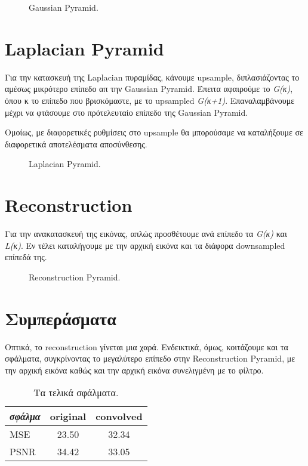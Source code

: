\documentclass[11pt]{scrartcl} %
\begin{document}
\begin{figure}[h]
    \centering
    \caption{Gaussian Pyramid.}
\end{figure}

\section{Laplacian Pyramid}

Για την κατασκευή της Laplacian πυραμίδας, κάνουμε upsample, διπλασιάζοντας το αμέσως μικρότερο επίπεδο απ την Gaussian Pyramid. Έπειτα αφαιρούμε
το \textit{G(κ)}, όπου κ το επίπεδο που βρισκόμαστε, με το upsampled \textit{G(κ+1)}. Επαναλαμβάνουμε μέχρι να φτάσουμε στο πρότελευταίο επίπεδο
της Gaussian Pyramid.


Ομοίως, με διαφορετικές ρυθμίσεις στο upsample θα μπορούσαμε να καταλήξουμε σε διαφορετικά αποτελέσματα αποσύνθεσης.

\begin{figure}[h]
    \centering
    \caption{Laplacian Pyramid.}
\end{figure}
\clearpage

\section{Reconstruction}

Για την ανακατασκευή της εικόνας, απλώς προσθέτουμε ανά επίπεδο τα \textit{G(κ)} και \textit{L(κ)}. Εν τέλει καταλήγουμε με την αρχική εικόνα
και τα διάφορα downsampled επίπεδά της.

\begin{figure}[h]
    \centering
    \caption{Reconstruction Pyramid.}
\end{figure}


\section{Συμπεράσματα}

Οπτικά, το reconstruction γίνεται μια χαρά. Ενδεικτικά, όμως, κοιτάζουμε και τα σφάλματα, συγκρίνοντας το μεγαλύτερο επίπεδο στην Reconstruction Pyramid, με την αρχική εικόνα
καθώς και την αρχική εικόνα συνελιγμένη με το φίλτρο.

\begin{table}[h] %
	\centering %
	\begin{tabular}{l c c}
		\toprule
		\textit{σφάλμα} & \textbf{original} & \textbf{convolved} \\
		\midrule
		\midrule
		MSE & 23.50 & 32.34 \\
		\midrule
		PSNR & 34.42 & 33.05 \\
		\bottomrule
	\end{tabular}
	\caption{Τα τελικά σφάλματα.}
\end{table}
\end{document}
